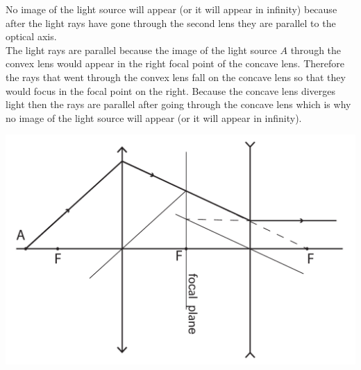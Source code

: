\documentclass[11pt]{article}
\begin{document}
\solueng
No image of the light source will appear (or it will appear in infinity) because after the light rays have gone through the second lens they are parallel to the optical axis.\\
The light rays are parallel because the image of the light source $A$ through the convex lens would appear in the right focal point of the concave lens. Therefore the rays that went through the convex lens fall on the concave lens so that they would focus in the focal point on the right. Because the concave lens diverges light then the rays are parallel after going through the concave lens which is why no image of the light source will appear (or it will appear in infinity).
\begin{center}
	\includegraphics[width=0.7\linewidth]{2017-lahg-02-valgusallikaslah_ing}
\end{center}
\probend
\bigskip

\end{document}
